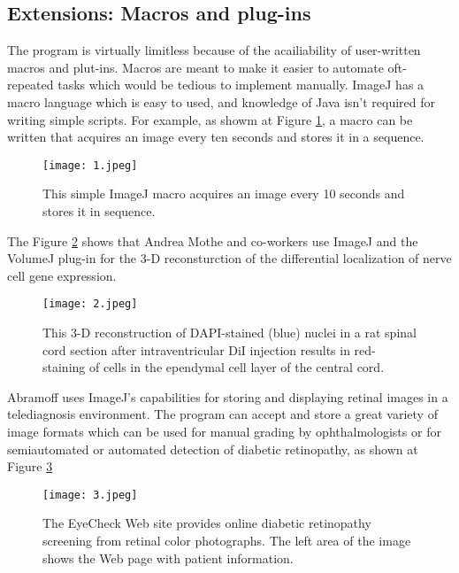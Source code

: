 \documentclass[a4paper]{article}
\begin{document}
\begin{multicols}{2}
\section{Extensions: Macros and plug-ins}
The program is virtually limitless because of the acailiability of user-written macros and plut-ins. Macros are meant to make it easier to automate oft-repeated tasks which would be tedious to implement manually. ImageJ has a macro language which is easy to used, and knowledge of Java isn't required for writing simple scripts. For example, as showm at Figure \ref{fig1}, a macro can be written that acquires an image every ten seconds and stores it in a sequence. \cite{ImageJ}\\
\begin{figure}[H]
\centering
\texttt{[image: 1.jpeg]}
\caption{This simple ImageJ macro acquires an image every 10 seconds and stores it in sequence.}
\label{fig1}
\end{figure}
The Figure \ref{fig2} shows that Andrea Mothe and co-workers use ImageJ and the VolumeJ plug-in for the 3-D reconsturction of the differential localization of nerve cell gene expression.\\
\begin{figure}[H]
\centering
\texttt{[image: 2.jpeg]}
\caption{This 3-D reconstruction of DAPI-stained (blue) nuclei in a rat spinal cord section after intraventricular DiI injection results in red-staining of cells in the ependymal cell layer of the central cord. }
\label{fig2}
\end{figure}
Abramoff uses ImageJ's capabilities for storing and displaying retinal images in a telediagnosis environment. The program can accept and store a great variety of image formats which can be used for manual grading by ophthalmologists or for semiautomated or automated detection of diabetic retinopathy, as shown at Figure \ref{fig3}\\
\begin{figure}[H]
\centering
\texttt{[image: 3.jpeg]}
\caption{The EyeCheck Web site provides online diabetic retinopathy screening from retinal color photographs. The left area of the image shows the Web page with patient information.}
\label{fig3}
\end{figure} 
\end{multicols}

\end{document}
